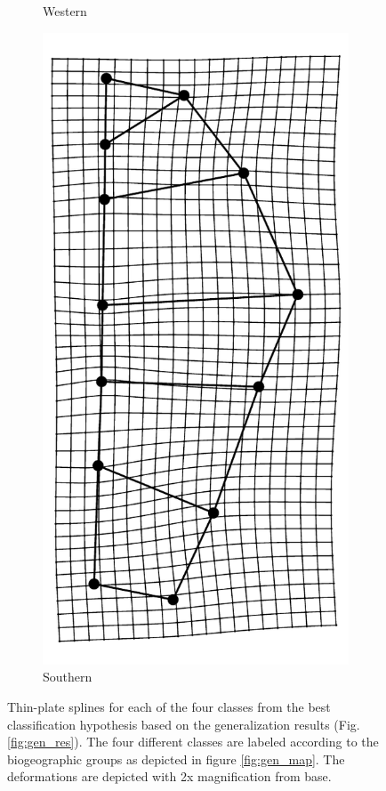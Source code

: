 \documentclass[12pt,letterpaper]{article}\usepackage{graphicx, color}
\begin{document}
\begin{figure}[ht]
\begin{subfigure}[b]{0.4\textwidth}
    \caption{Western}
    \label{fig:mean_shape3}
  \end{subfigure}
  \begin{subfigure}[b]{0.4\textwidth}
    \centering
    \includegraphics[width = \textwidth, height = 0.35\textheight, keepaspectratio = true]{figure/mshape_4}
    \caption{Southern}
    \label{fig:mean_shape4}
  \end{subfigure}
  \caption{Thin-plate splines for each of the four classes from the best classification hypothesis based on the generalization results (Fig. \ref{fig:gen_res}). The four different classes are labeled according to the biogeographic groups as depicted in figure \ref{fig:gen_map}. The deformations are depicted with 2x magnification from base.}
  \label{fig:mean_shape}
\end{figure}
\end{document}
